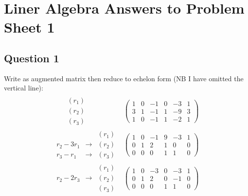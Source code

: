 \documentclass[letterpaper,10pt,english]{jupyterBook}
\begin{document}
\chapter{Liner Algebra \sphinxhyphen{} Answers to Problem Sheet 1}
\label{\detokenize{LinearAlgebra/problems/solutions_1:liner-algebra-answers-to-problem-sheet-1}}\label{\detokenize{LinearAlgebra/problems/solutions_1::doc}}

\section{Question 1}
\label{\detokenize{LinearAlgebra/problems/solutions_1:question-1}}
\sphinxAtStartPar
Write as augmented matrix then reduce to echelon form (NB I have omitted the vertical line):
\begin{equation*}
\begin{split}
\begin{array}{rc}
\begin{array}{ccr}
 & & (r_1)\\
 & & (r_2)\\
& & (r_3)
\end{array}
&
\begin{pmatrix}
1 & 0 & -1 & 0 & -3 & 1\\
3 & 1 & -1 & 1 & -9 & 3\\
1 & 0 & -1 & 1 & -2 & 1
\end{pmatrix}\\
\begin{array}{ccr}
  & & (r_1)\\
r_2 - 3r_1 & \longrightarrow & (r_2)\\
r_3 - r_1 & \longrightarrow & (r_3)
\end{array}
&
\begin{pmatrix}
1 & 0 & -1 & 9 & -3 & 1\\
0 & 1 & 2 & 1 & 0 & 0\\
0 & 0 & 0 & 1 & 1 & 0
\end{pmatrix}\\
\begin{array}{ccr}
 & & (r_1)\\
 r_2 - 2r_3 & \longrightarrow & (r_2)\\
 & & (r_3)
\end{array}
&
\begin{pmatrix}
1 & 0 & -3 & 0 & -3 & 1\\
0 & 1 & 2 & 0 & -1 & 0\\
0 & 0 & 0 & 1 & 1 & 0
\end{pmatrix}
\end{array}
\end{split}
\end{equation*}
\end{document}
